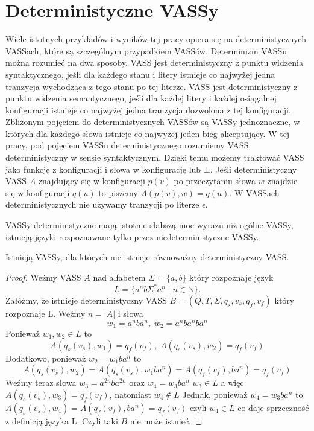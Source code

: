     \section{Deterministyczne VASSy}
    Wiele istotnych przykładów i wyników tej pracy opiera się na deterministycznych VASSach, które są szczególnym przypadkiem VASSów.
    Determinizm VASSu można rozumieć na dwa sposoby.
    VASS jest deterministyczny z punktu widzenia syntaktycznego, jeśli dla każdego stanu i litery istnieje co najwyżej
    jedna tranzycja wychodząca z tego stanu po tej literze.
    VASS jest deterministyczny z punktu widzenia semantycznego, jeśli dla każdej litery i każdej osiągalnej konfiguracji
    istnieje co najwyżej jedna tranzycja dozwolona z tej konfiguracji.
    Zbliżonym pojęciem do deterministycznych VASSów są VASSy jednoznaczne, w których dla każdego słowa istnieje co najwyżej jeden bieg
    akceptujący.
    W tej pracy, pod pojęciem VASSu deterministycznego rozumiemy VASS deterministyczny w sensie syntaktycznym.
    Dzięki temu możemy traktować VASS jako funkcję z konfiguracji i słowa w konfigurację lub $\bot$.
    Jeśli deterministyczny VASS $A$ znajdujący się w konfiguracji $p(v)$ po przeczytaniu słowa $w$  znajdzie się w konfiguracji $q(u)$ to piszemy
    $A(p(v),w) = q(u)$.
    W VASSach deterministycznych nie używamy tranzycji po literze $\epsilon$.

    VASSy deterministyczne mają istotnie słabszą moc wyrazu niż ogólne VASSy, istnieją języki rozpoznawane tylko przez niedeterministyczne VASSy.
    \begin{theorem}
        \label{non-det}
        Istnieją VASSy, dla których nie istnieje równoważny deterministyczny VASS.
    \end{theorem}
    \begin{proof}
        Weźmy VASS $A$ nad alfabetem $\Sigma = \{a,b\}$  który rozpoznaje język  \[L = \{a^n b \Sigma^* a^n \mid n \in \mathbb{N}\}.\]
        Załóżmy, że istnieje deterministyczny VASS $B=(Q,T,\Sigma,q_s,v_s,q_f,v_f)$ który rozpoznaje L.
        Weźmy $n=|A|$ i słowa \[w_1 = a^n b a^n,\; w_2 = a^n b a^n b a^n\]
        Ponieważ $w_1,w_2 \in L$ to \[A(q_s(v_s),w_1) = q_f(v_f), \;A(q_s(v_s),w_2) = q_f(v_f)\]
        Dodatkowo, ponieważ $w_2 = w_1 b a^n$ to \[A(q_s(v_s),w_2) = A(q_s(v_s),w_1 b a^n)  = A(q_f(v_f),b a^n) = q_f(v_f) \]
        Weźmy teraz słowa $w_3 = a^{2n} b a^{2n} $ oraz $w_4 =  w_3 b a^n $
        $w_3 \in L$ a więc $A(q_s(v_s),w_3) = q_f(v_f)$, natomiast $w_4 \notin L$
        Jednak, ponieważ $w_4 =  w_3 b a^n $ to $A(q_s(v_s),w_4) = A(q_f(v_f),b a^n) = q_f(v_f)$ czyli $w_4 \in L$
        co daje sprzeczność z definicją języka L. Czyli taki $B$ nie może istnieć.
    \end{proof}

